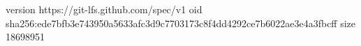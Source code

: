 version https://git-lfs.github.com/spec/v1
oid sha256:ede7bfb3e743950a5633afc3d9c7703173c8f4dd4292ce7b6022ae3e4a3fbcff
size 18698951
